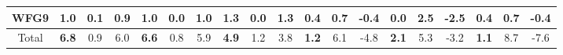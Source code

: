 \begin{table}[t]
\begin{tabular}{c|c|c|c|c|c|c|c|c|c|ccccccccc}
\multicolumn{1}{|c|}{WFG9}  & 1.0          & 0.1          & 0.9   & 1.0          & 0.0          & 1.0   & 1.3          & 0.0          & 1.3   & \multicolumn{1}{c|}{0.4}          & \multicolumn{1}{c|}{0.7}          & \multicolumn{1}{c|}{-0.4}  & \multicolumn{1}{c|}{0.0}          & \multicolumn{1}{c|}{2.5}          & \multicolumn{1}{c|}{-2.5}  & \multicolumn{1}{c|}{0.4}          & \multicolumn{1}{c|}{0.7}          & \multicolumn{1}{c|}{-0.4}  \\ \hline
\multicolumn{1}{|c|}{Total} & \textbf{6.8} & 0.9          & 6.0   & \textbf{6.6} & 0.8          & 5.9   & \textbf{4.9} & 1.2          & 3.8   & \multicolumn{1}{c|}{\textbf{1.2}} & \multicolumn{1}{c|}{6.1}          & \multicolumn{1}{c|}{-4.8}  & \multicolumn{1}{c|}{\textbf{2.1}} & \multicolumn{1}{c|}{5.3}          & \multicolumn{1}{c|}{-3.2}  & \multicolumn{1}{c|}{\textbf{1.1}} & \multicolumn{1}{c|}{8.7}          & \multicolumn{1}{c|}{-7.6}  \\ \hline
\end{tabular}
\end{table}


